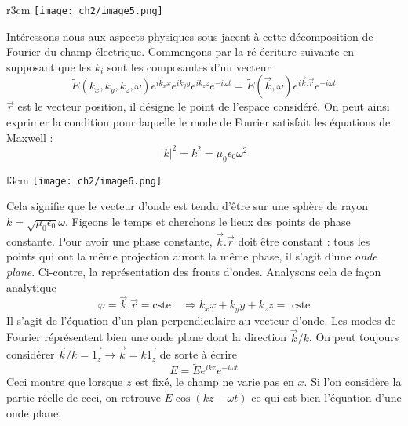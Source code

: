 \begin{wrapfigure}[9]{r}{3cm}
\texttt{[image: ch2/image5.png]}
\end{wrapfigure}
Intéressons-nous aux aspects physiques sous-jacent à cette décomposition de Fourier du champ 
électrique. Commençons par la ré-écriture suivante en supposant que les $k_i$ sont les 
composantes d'un vecteur
\begin{equation}
\tilde{E}(k_x,k_y,k_z,\omega)e^{ik_xx}e^{ik_yy}e^{ik_zz}e^{-i\omega t} = \tilde{E}(\vec{k},
\omega)e^{i\vec{k}.\vec{r}}e^{-i\omega t}
\end{equation}
\danger $\vec{r}$ est le vecteur position, il désigne le point de l'espace considéré. On peut 
ainsi exprimer la condition pour laquelle le mode de Fourier satisfait les équations de Maxwell  :
\begin{equation}
|k|^2 = k^2 = \mu_0\epsilon_0\omega^2
\end{equation}

\begin{wrapfigure}[9]{l}{3cm}
\vspace{-6mm}
\texttt{[image: ch2/image6.png]}
\end{wrapfigure}
Cela signifie que le vecteur d'onde est tendu d'être sur une sphère de rayon $k=
\sqrt{\mu_0\epsilon_0}\omega$. Figeons le temps et cherchons le lieux des points de phase 
constante. Pour avoir une phase constante, $\vec{k}.\vec{r}$ doit être constant : tous les 
points qui ont la même projection auront la même phase, il s'agit d'une \textit{onde plane}.
Ci-contre, la représentation des fronts d'ondes. Analysons cela de façon analytique
\begin{equation}
\varphi = \vec{k}.\vec{r} = \text{cste}\quad \Rightarrow k_xx+k_yy+k_zz = \text{ cste}
\end{equation}
Il s'agit de l’équation d'un plan perpendiculaire au vecteur d'onde. Les modes de Fourier 
réprésentent bien une onde plane dont la direction $\vec{k}/k$. On peut toujours considérer 
$\vec{k}/k = \vec{1_z} \rightarrow \vec{k}= k\vec{1_z}$ de sorte à écrire
\begin{equation}
E = \tilde{E}e^{ikz}e^{-i\omega t}
\end{equation}
Ceci montre que lorsque $z$ est fixé, le champ ne varie pas en $x$. Si l'on considère la 
partie réelle de ceci, on retrouve $\tilde{E}\cos(kz-\omega t)$ ce qui est bien l'équation 
d'une onde plane.\\


